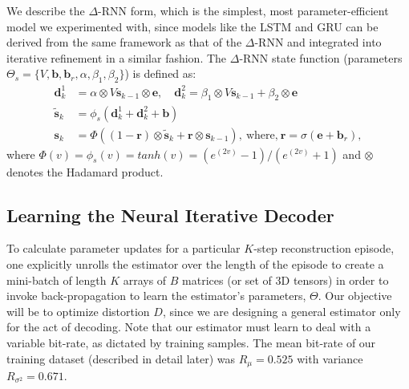 \documentclass[smallabstract,smallcaptions]{dccpaper}
\begin{document}
We describe the $\Delta$-RNN form, which is the simplest, most parameter-efficient model we experimented with, since models like the LSTM and GRU can be derived from the same framework as that of the $\Delta$-RNN \cite{ororbia2017diff} and integrated into iterative refinement in a similar fashion. The $\Delta$-RNN state function (parameters $\Theta_s = \{V, \mathbf{b}, \mathbf{b}_r, \alpha, \beta_1, \beta_2 \}$) is defined as:
\begin{align}
\mathbf{d}^1_k &= \alpha \otimes V \mathbf{s}_{k-1} \otimes \mathbf{e}, \quad
\mathbf{d}^2_k = \beta_1 \otimes V \mathbf{s}_{k-1} + \beta_2 \otimes \mathbf{e} \\
\widetilde{\mathbf{s}}_k &= \phi_s(\mathbf{d}^1_k + \mathbf{d}^2_k + \mathbf{b}) \\
\mathbf{s}_k &=  \Phi( (1 - \mathbf{r}) \otimes \widetilde{\mathbf{s}}_k + \mathbf{r} \otimes \mathbf{s}_{k-1} ), \ \mbox{where,} \ \mathbf{r} =  \sigma(\mathbf{e} + \mathbf{b}_r) \label{general_second_order},
\end{align}
where $\Phi(v) = \phi_s(v) = tanh(v) = (e^{(2v)} - 1) / (e^{(2v)} + 1)$ and $\otimes$ denotes the Hadamard product.






\subsection{Learning the Neural Iterative Decoder}
\label{sec:learning}
To calculate parameter updates for a particular $K$-step reconstruction episode, one explicitly unrolls the estimator over the length of the episode to create a mini-batch of length $K$ arrays of $B$ matrices (or set of 3D tensors) in order to invoke back-propagation to learn the estimator's parameters, $\Theta$.
Our objective will be to optimize distortion $D$, since we are designing a general estimator only for the act of decoding. Note that our estimator must learn to deal with a variable bit-rate, as dictated by training samples.
The mean bit-rate of our training dataset (described in detail later) was $R_\mu = 0.525$ with variance $R_{\sigma^2} = 0.671$. %
\end{document}
